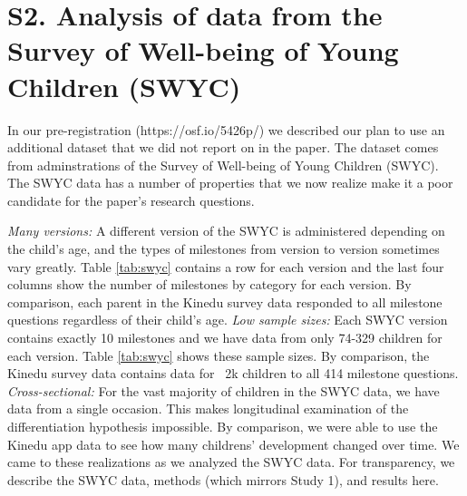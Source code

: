 \documentclass[man]{apa7}
\begin{document}
\section{S2. Analysis of data from the Survey of Well-being of Young Children (SWYC)}

In our pre-registration (https://osf.io/5426p/) we described our plan to use an additional dataset that we did not report on in the paper. The dataset comes from adminstrations of the Survey of Well-being of Young Children (SWYC). The SWYC data has a number of properties that we now realize make it a poor candidate for the paper's research questions.

\textit{Many versions:} A different version of the SWYC is administered depending on the child's age, and the types of milestones from version to version sometimes vary greatly. Table \ref{tab:swyc} contains a row for each version and the last four columns show the number of milestones by category for each version. By comparison, each parent in the Kinedu survey data responded to all milestone questions regardless of their child's age.
\textit{Low sample sizes:} Each SWYC version contains exactly 10 milestones and we have data from only 74-329 children for each version. Table \ref{tab:swyc} shows these sample sizes. By comparison, the Kinedu survey data contains data for ~2k children to all 414 milestone questions.
\textit{Cross-sectional:} For the vast majority of children in the SWYC data, we have data from a single occasion. This makes longitudinal examination of the differentiation hypothesis impossible. By comparison, we were able to use the Kinedu app data to see how many childrens' development changed over time.
We came to these realizations as we analyzed the SWYC data. For transparency, we describe the SWYC data, methods (which mirrors Study 1), and results here.
\end{document}
